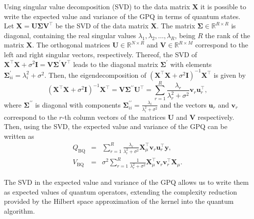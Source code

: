 \documentclass[10pt]{article}
\begin{document}
	
	Using singular value decomposition (SVD) to the data matrix $\mathbf{X}$ it is possible to write the expected value and variance of the GPQ in terms of quantum states. 
	Let $\mathbf{X}=\mathbf{U}\boldsymbol{\Sigma} \mathbf{V}^{\top}$ be the SVD of the data matrix $\mathbf{X}$. 
	The matrix $\boldsymbol{\Sigma}\in \mathbb{R}^{R\times R}$ is diagonal, containing the real singular values $\lambda_1,\lambda_2, \ldots,\lambda_R$, being $R$ the rank of the matrix $\mathbf{X}$. 
	The orthogonal matrices $\mathbf{U}\in \mathbb{R}^{N \times R}$ and $\mathbf{V}\in \mathbb{R}^{R \times M}$ correspond to the left and right singular vectors, respectively.
	Thereof, the SVD of $\mathbf{X}^{\top}\mathbf{X}+\sigma^{2}\mathbf{I} = \mathbf{V}\boldsymbol{\Sigma}^{\prime} \mathbf{V}^{\top}$ leads to the diagonal matrix $\boldsymbol{\Sigma}^{\prime}$ with elements $\boldsymbol{\Sigma}^{\prime}_{ii} = \lambda_{i}^{2} + \sigma^2$. 
	Then, the eigendecomposition of  $\left(\mathbf{X}^{\top}\mathbf{X}+\sigma^{2} \mathbf{I}\right)^{-1}\mathbf{X}^{\top}$ is given by
	\begin{equation} 
		\left(\mathbf{X}^{\top}\mathbf{X}+\sigma^{2} \mathbf{I}\right)^{-1} \mathbf{X}^{\top} = \mathbf{V}\boldsymbol{\Sigma}^{\prime\prime}\mathbf{U}^{\top} =\sum_{r=1}^{R} \frac{\lambda_{r}}{\lambda_{r}^{2}+\sigma^{2}}
		\mathbf{v}_{r} \mathbf{u}_{r}^{\top},
		\label{eq: eigendecomposition}
	\end{equation}
	where $\boldsymbol{\Sigma}^{\prime\prime}$ is diagonal with components $\boldsymbol{\Sigma}^{\prime\prime}_{ii} = \frac{\lambda_{i}}{\lambda_{i}^{2}+\sigma^{2}}$ and the vectors $ \mathbf{u}_{r}$ and $\mathbf{v}_{r}$ correspond to the $r$-th column vectors of the matrices $\mathbf{U}$ and $\mathbf{V}$ respectively. 
	Then, using the SVD, the expected value and variance of the GPQ can be written as
	\begin{eqnarray}
		Q_{\mathrm{BQ}}&=& \sum_{r=1}^{R} \frac{\lambda_{r}}{\lambda_{r}^{2} + \sigma^{2}} \mathbf{X}_\mu^{\top} \mathbf{v}_{r} \mathbf{u}_{r}^{\top}\mathbf{y}, \label{eq: SVD mean GPQ}\\
		V_{\mathrm{BQ}}&=&\sigma^{2}\sum_{r=1}^{R} \frac{1}{\lambda_{r}^{2}+\sigma^{2}} \mathbf{X}_\mu^{\top}  \mathbf{v}_{r}\mathbf{v}_{r}^{\top}\mathbf{X}_\mu.\label{eq: SVD variance GPQ}
	\end{eqnarray}
	
	The SVD in the expected value and variance of the GPQ allows us to write them as expected values of quantum operators, extending the complexity reduction provided by the Hilbert space approximation of the kernel into the quantum algorithm.
	
\end{document}

